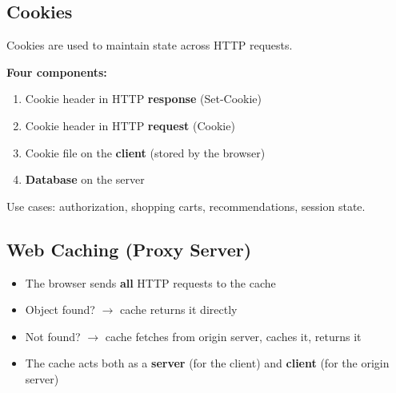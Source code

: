 \begin{imagebox}
\end{imagebox}

\subsection{Cookies}

\begin{keybox}
Cookies are used to maintain state across HTTP requests.

\textbf{Four components:}
\begin{enumerate}[noitemsep]
    \item Cookie header in HTTP \textbf{response} (Set-Cookie)
    \item Cookie header in HTTP \textbf{request} (Cookie)
    \item Cookie file on the \textbf{client} (stored by the browser)
    \item \textbf{Database} on the server
\end{enumerate}

Use cases: authorization, shopping carts, recommendations, session state.
\end{keybox}

\begin{imagebox}
\end{imagebox}

\subsection{Web Caching (Proxy Server)}

\begin{keybox}
\begin{itemize}[noitemsep]
    \item The browser sends \textbf{all} HTTP requests to the cache
    \item Object found? $\rightarrow$ cache returns it directly
    \item Not found? $\rightarrow$ cache fetches from origin server, caches it, returns it
    \item The cache acts both as a \textbf{server} (for the client) and \textbf{client} (for the origin server)
\end{itemize}
\end{keybox}

